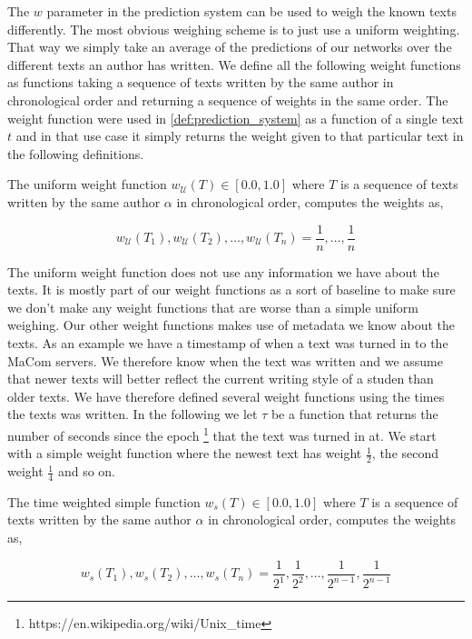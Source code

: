 The $w$ parameter in the prediction system can be used to weigh the known
texts differently. The most obvious weighing scheme is to just use a uniform
weighting. That way we simply take an average of the predictions of our networks
over the different texts an author has written. We define all the following
weight functions as functions taking a sequence of texts written by the same
author in chronological order and returning a sequence of weights in the same
order. The weight function were used in \ref{def:prediction_system} as a
function of a single text $t$ and in that use case it simply returns the weight
given to that particular text in the following definitions.

\begin{definition}

    The uniform weight function $w_\mathcal{U}(T) \in [0.0, 1.0]$
    where $T$ is a sequence of texts written by the same author $\alpha$ in
    chronological order, computes the weights as,

    \begin{equation}
        w_\mathcal{U}(T_1), w_\mathcal{U}(T_2), \dots, w_\mathcal{U}(T_n) =
        \frac{1}{n}, \dots, \frac{1}{n}
    \end{equation}

\end{definition}

The uniform weight function does not use any information we have about the
texts. It is mostly part of our weight functions as a sort of baseline to
make sure we don't make any weight functions that are worse than a simple
uniform weighing. Our other weight functions makes use of metadata we know
about the texts. As an example we have a timestamp of when a text was turned
in to the MaCom servers. We therefore know when the text was written and
we assume that newer texts will better reflect the current writing style
of a studen than older texts. We have therefore defined several weight
functions using the times the texts was written. In the following we let
$\tau$ be a function that returns the number of seconds since the epoch
\footnote{https://en.wikipedia.org/wiki/Unix\_time} that the text was turned in
at. We start with a simple weight function where the newest text has weight
$\frac{1}{2}$, the second weight $\frac{1}{4}$ and so on.

\begin{definition}

    The time weighted simple function $w_s(T) \in [0.0, 1.0]$ where $T$ is a
    sequence of texts written by the same author $\alpha$ in chronological
    order, computes the weights as,

    \begin{equation}
        w_s(T_1), w_s(T_2), \dots, w_s(T_n) = \frac{1}{2^1}, \frac{1}{2^2},
        \dots, \frac{1}{2^{n-1}}, \frac{1}{2^{n-1}}
    \end{equation}

\end{definition}

